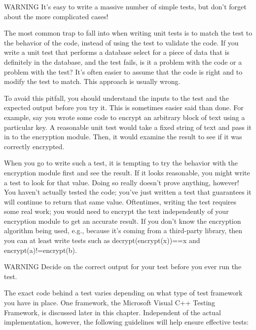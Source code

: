 \begin{myWarning}{WARNING}
It’s easy to write a massive number of simple tests, but don’t forget about the more complicated cases!
\end{myWarning}


The most common trap to fall into when writing unit tests is to match the test to the behavior of the code, instead of using the test to validate the code. If you write a unit test that performs a database select for a piece of data that is definitely in the database, and the test fails, is it a problem with the code or a problem with the test? It’s often easier to assume that the code is right and to modify the test to match. This approach is usually wrong.

To avoid this pitfall, you should understand the inputs to the test and the expected output before you try it. This is sometimes easier said than done. For example, say you wrote some code to encrypt an arbitrary block of text using a particular key. A reasonable unit test would take a fixed string of text and pass it in to the encryption module. Then, it would examine the result to see if it was correctly encrypted.

When you go to write such a test, it is tempting to try the behavior with the encryption module first and see the result. If it looks reasonable, you might write a test to look for that value. Doing so really doesn’t prove anything, however! You haven’t actually tested the code; you’ve just written a test that guarantees it will continue to return that same value. Oftentimes, writing the test requires some real work; you would need to encrypt the text independently of your encryption module to get an accurate result. If you don’t know the encryption algorithm being used, e.g., because it’s coming from a third-party library, then you can at least write tests such as decrypt(encrypt(x))==x and encrypt(a)!=encrypt(b).

\begin{myWarning}{WARNING}
Decide on the correct output for your test before you ever run the test.
\end{myWarning}


The exact code behind a test varies depending on what type of test framework you have in place. One framework, the Microsoft Visual C++ Testing Framework, is discussed later in this chapter. Independent of the actual implementation, however, the following guidelines will help ensure effective tests:


